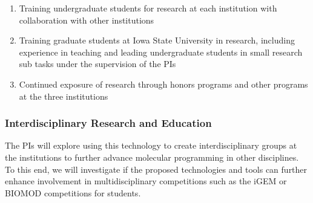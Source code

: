 \begin{enumerate}
	\item Training undergraduate students for research at each institution with collaboration with other institutions
	\item Training graduate students at Iowa State University in research, including experience in teaching and leading undergraduate students in small research sub tasks under the supervision of the PIs
	\item Continued exposure of research through honors programs and other programs at the three institutions
\end{enumerate}

\subsubsection*{Interdisciplinary Research and Education}
The PIs will explore using this technology to create interdisciplinary groups at the institutions to further advance molecular programming in other disciplines.  To this end, we will investigate if the proposed technologies and tools can further enhance involvement in multidisciplinary competitions such as the iGEM or BIOMOD competitions for students.

